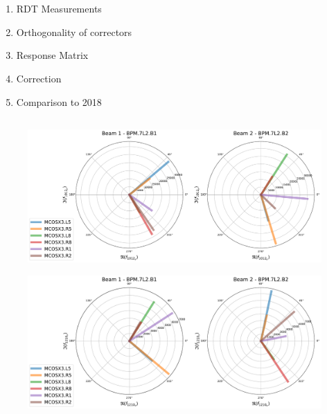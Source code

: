 \chapter{}
\label{chapter:skew_octupole_fields}
\thumbforchapter{}

\section{}

\begin{enumerate}
    \color{red}
    \item RDT Measurements
    \item Orthogonality of correctors
    \item Response Matrix
    \item Correction
    \item Comparison to 2018
\end{enumerate}


\section{}

\begin{figure}[H]
    \includegraphics[width=\textwidth]{./chapters/07_octupoles/images/f1012_y_injection.pdf}
    \caption{}
    \label{fig:a4_injection_orthogonal_f1012}
\end{figure}

\begin{figure}[H]
    \includegraphics[width=\textwidth]{chapters/07_octupoles/images/f1210_x_injection.pdf}
    \caption{}
    \label{fig:a4_injection_orthogonal_f1210}
\end{figure}





\section{}